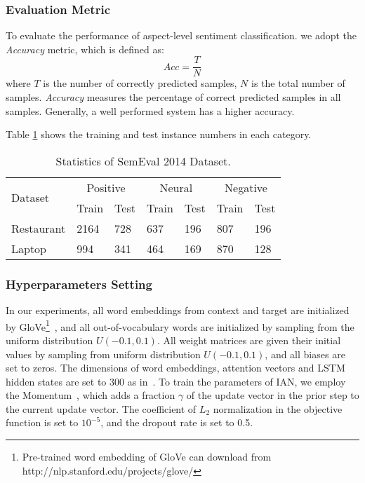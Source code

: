 \documentclass{article}
\begin{document}
\subsubsection*{Evaluation Metric} 
To evaluate the performance of aspect-level sentiment classification. we adopt the  \emph{Accuracy} metric, which is defined as:
\begin{equation}
Acc = \frac{T}{N}
\end{equation}
where $T$ is the number of correctly predicted samples, $N$ is the total number of samples.
\emph{Accuracy} measures the percentage of correct predicted samples in all samples. Generally, a well performed system has a higher accuracy.

Table \ref{tab:stat} shows the  training and test instance numbers in each category.
\begin{table}[htb]
	\centering
	\begin{tabular}{|l|l|l|l|l|l|l|}
		\hline
		\multirow{2}{*}{Dataset} & \multicolumn{2}{c|}{Positive} & \multicolumn{2}{c|}{Neural} & \multicolumn{2}{c|}{Negative} \\ \cline{2-7} 
		& \multicolumn{1}{l|}{Train}    & \multicolumn{1}{l|}{Test}   & \multicolumn{1}{l|}{Train} 
		& \multicolumn{1}{l|}{Test}     & \multicolumn{1}{l|}{Train}  & \multicolumn{1}{l|}{Test} \\ \hline
		Restaurant              &2164                           &728                          &637                                     
		&196                            &807                          &196                        \\ \hline
		Laptop                  &994                            &341                          &464                                    
		&169                            &870                          &128                        \\ \hline
	\end{tabular}
	\caption{Statistics of SemEval 2014 Dataset.}
	\label{tab:stat}
\end{table}

\subsubsection*{Hyperparameters Setting}
In our experiments, all word embeddings from context and target are initialized by GloVe\footnote{Pre-trained word embedding of GloVe can download from http://nlp.stanford.edu/projects/glove/}~\cite{pennington2014glove}, and all out-of-vocabulary words are initialized by  sampling from the uniform distribution $U(-0.1, 0.1)$. All weight matrices are given their initial values by sampling from uniform distribution $U(-0.1, 0.1)$, and all biases are set to zeros.
The dimensions of word embeddings, attention vectors and LSTM hidden states are set to 300 as in~\cite{wang2016attention}.
To train the parameters of IAN, we employ the Momentum~\cite{qian1999momentum}, which adds a fraction $\gamma$ of the update vector in the prior step to the current update vector.
The coefficient of $L_2$ normalization in the objective function is set to $10^{-5}$, and the dropout rate is set to 0.5.
\end{document}
